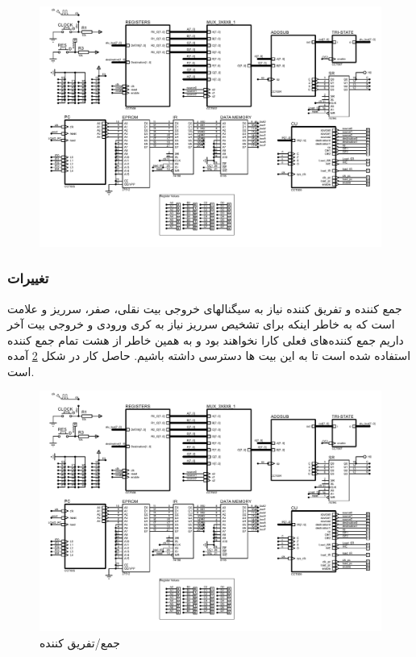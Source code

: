 \documentclass{article}
\begin{document}
\begin{figure}
	\centering
	\includegraphics[scale=0.6,page=5]{./graphics/graphics}
	\caption{}
	\label{fig:pc}
\end{figure}

\subsubsection{تغییرات }
جمع کننده و تفریق کننده نیاز به سیگنالهای خروجی بیت نقلی، صفر، سرریز و علامت است که به خاطر اینکه برای تشخیص سرریز نیاز به کری ورودی و خروجی بیت آخر داریم جمع کننده‌های فعلی کارا نخواهند بود و به همین خاطر از هشت تمام جمع کننده استفاده شده است تا به این بیت ها دسترسی داشته باشیم. حاصل کار در شکل \ref{fig:as} آمده است.

\begin{figure}
	\centering
	\includegraphics[scale=0.5,page=3]{./graphics/graphics}
	\caption{جمع/تفریق کننده}
	\label{fig:as}
\end{figure}
\end{document}
